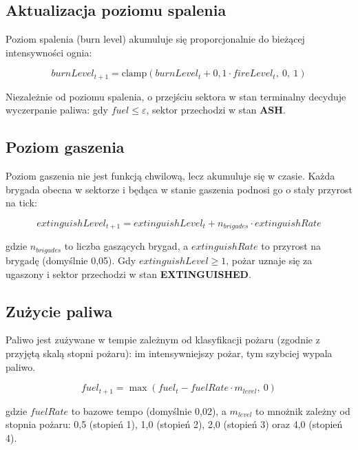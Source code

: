 \subsection{Aktualizacja poziomu spalenia}

Poziom spalenia (burn level) akumuluje się proporcjonalnie do bieżącej intensywności ognia:

\begin{equation}
burnLevel_{t+1} = \mathrm{clamp}\!\left(burnLevel_t + 0{,}1 \cdot fireLevel_t,\ 0,\ 1\right)
\end{equation}

Niezależnie od poziomu spalenia, o przejściu sektora w stan terminalny decyduje wyczerpanie paliwa: gdy $fuel \leq \varepsilon$, sektor przechodzi w stan \textbf{ASH}.

\subsection{Poziom gaszenia}

Poziom gaszenia nie jest funkcją chwilową, lecz akumuluje się w czasie. Każda brygada obecna w sektorze i będąca w stanie gaszenia podnosi go o stały przyrost na tick:

\begin{equation}
extinguishLevel_{t+1} = extinguishLevel_t + n_{brigades} \cdot extinguishRate
\end{equation}

gdzie $n_{brigades}$ to liczba gaszących brygad, a $extinguishRate$ to przyrost na brygadę (domyślnie 0,05). Gdy $extinguishLevel \geq 1$, pożar uznaje się za ugaszony i sektor przechodzi w stan \textbf{EXTINGUISHED}.

\subsection{Zużycie paliwa}

Paliwo jest zużywane w tempie zależnym od klasyfikacji pożaru (zgodnie z przyjętą skalą stopni pożaru): im intensywniejszy pożar, tym szybciej wypala paliwo.

\begin{equation}
fuel_{t+1} = \max\!\left(fuel_t - fuelRate \cdot m_{level},\ 0\right)
\end{equation}

gdzie $fuelRate$ to bazowe tempo (domyślnie 0,02), a $m_{level}$ to mnożnik zależny od stopnia pożaru: 0,5 (stopień 1), 1,0 (stopień 2), 2,0 (stopień 3) oraz 4,0 (stopień 4).

